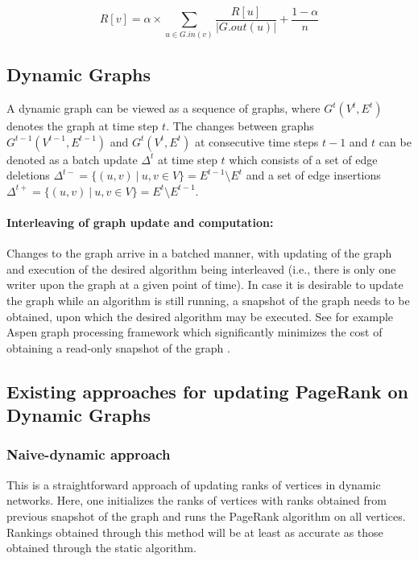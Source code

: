 \begin{equation}
\label{eq:pr}
    R[v] = \alpha \times \sum_{u \in G.in(v)} \frac{R[u]}{|G.out(u)|} + \frac{1 - \alpha}{n}
\end{equation}




\subsection{Dynamic Graphs}
\label{sec:about-dynamic}

A dynamic graph can be viewed as a sequence of graphs, where $G^t(V^t, E^t)$ denotes the graph at time step $t$. The changes between graphs $G^{t-1}(V^{t-1}, E^{t-1})$ and $G^t(V^t, E^t)$ at consecutive time steps $t-1$ and $t$ can be denoted as a batch update $\Delta^t$ at time step $t$ which consists of a set of edge deletions $\Delta^{t-} = \{(u, v)\ |\ u, v \in V\} = E^{t-1} \setminus E^t$ and a set of edge insertions $\Delta^{t+} = \{(u, v)\ |\ u, v \in V\} = E^t \setminus E^{t-1}$.

\paragraph{Interleaving of graph update and computation:}

Changes to the graph arrive in a batched manner, with updating of the graph and execution of the desired algorithm being interleaved (i.e., there is only one writer upon the graph at a given point of time). In case it is desirable to update the graph while an algorithm is still running, a snapshot of the graph needs to be obtained, upon which the desired algorithm may be executed. See for example Aspen graph processing framework which significantly minimizes the cost of obtaining a read-only snapshot of the graph \cite{graph-dhulipala19}.




\subsection{Existing approaches for updating PageRank on Dynamic Graphs}

\subsubsection{Naive-dynamic approach}
\label{sec:about-naive}

This is a straightforward approach of updating ranks of vertices in dynamic networks. Here, one initializes the ranks of vertices with ranks obtained from previous snapshot of the graph and runs the PageRank algorithm on all vertices. Rankings obtained through this method will be at least as accurate as those obtained through the static algorithm.


